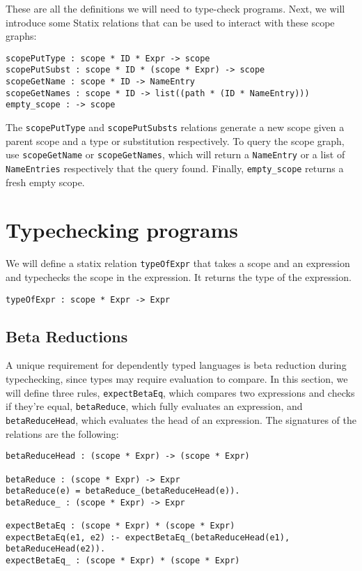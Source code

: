 These are all the definitions we will need to type-check programs. Next, we will introduce some Statix relations that can be used to interact with these scope graphs:

\begin{lstlisting}
scopePutType : scope * ID * Expr -> scope
scopePutSubst : scope * ID * (scope * Expr) -> scope
scopeGetName : scope * ID -> NameEntry
scopeGetNames : scope * ID -> list((path * (ID * NameEntry)))
empty_scope : -> scope
\end{lstlisting}

The \verb|scopePutType| and \verb|scopePutSubsts| relations generate a new scope given a parent scope and a type or substitution respectively. To query the scope graph, use \verb|scopeGetName| or \verb|scopeGetNames|, which will return a \verb|NameEntry| or a list of \verb|NameEntries| respectively that the query found. Finally, \verb|empty_scope| returns a fresh empty scope.

\section{Typechecking programs}

We will define a statix relation \verb|typeOfExpr| that takes a scope and an expression and typechecks the scope in the expression. It returns the type of the expression.

\begin{lstlisting}
typeOfExpr : scope * Expr -> Expr
\end{lstlisting}

\subsection{Beta Reductions}
A unique requirement for dependently typed languages is beta reduction during typechecking, since types may require evaluation to compare.  In this section, we will define three rules, \verb|expectBetaEq|, which compares two expressions and checks if they're equal, \verb|betaReduce|, which fully evaluates an expression, and \verb|betaReduceHead|, which evaluates the head of an expression. The signatures of the relations are the following:

\begin{lstlisting}
betaReduceHead : (scope * Expr) -> (scope * Expr)

betaReduce : (scope * Expr) -> Expr
betaReduce(e) = betaReduce_(betaReduceHead(e)).
betaReduce_ : (scope * Expr) -> Expr

expectBetaEq : (scope * Expr) * (scope * Expr)
expectBetaEq(e1, e2) :- expectBetaEq_(betaReduceHead(e1), betaReduceHead(e2)).
expectBetaEq_ : (scope * Expr) * (scope * Expr)
\end{lstlisting}

